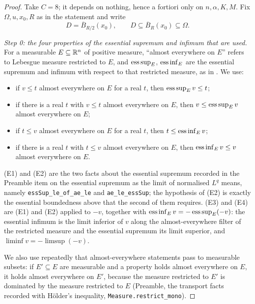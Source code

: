 \begin{proof}
Take $C=8$; it depends on nothing, hence a fortiori only on $n,\alpha,K,M$.
Fix $\Omega,u,x_0,R$ as in the statement and write
\[
D=\overline B_{R/2}(x_0),\qquad D\subseteq\overline B_R(x_0)\subseteq\Omega .
\]

\emph{Step 0: the four properties of the essential supremum and infimum that are
used.}  For a measurable $E\subseteq\mathbb{R}^n$ of positive measure, ``almost
everywhere on $E$'' refers to Lebesgue measure restricted to $E$, and
$\operatorname*{ess\,sup}_E$, $\operatorname*{ess\,inf}_E$ are the essential
supremum and infimum with respect to that restricted measure, as in
.  We use:
\begin{itemize}
\item[(E1)] if $v\le t$ almost everywhere on $E$ for a real $t$, then
  $\operatorname*{ess\,sup}_Ev\le t$;
\item[(E2)] if there is a real $t$ with $v\le t$ almost everywhere on $E$, then
  $v\le\operatorname*{ess\,sup}_Ev$ almost everywhere on $E$;
\item[(E3)] if $t\le v$ almost everywhere on $E$ for a real $t$, then
  $t\le\operatorname*{ess\,inf}_Ev$;
\item[(E4)] if there is a real $t$ with $t\le v$ almost everywhere on $E$, then
  $\operatorname*{ess\,inf}_Ev\le v$ almost everywhere on $E$.
\end{itemize}
(E1) and (E2) are the two facts about the essential supremum recorded in the
Preamble item on the essential supremum as the limit of normalised $L^q$ means,
namely \texttt{essSup\_le\_of\_ae\_le} and \texttt{ae\_le\_essSup}; the
hypothesis of (E2) is exactly the essential boundedness above that the second of
them requires.  (E3) and (E4) are (E1) and (E2) applied to $-v$, together with
$\operatorname*{ess\,inf}_Ev=-\operatorname*{ess\,sup}_E(-v)$: the essential
infimum is the limit inferior of $v$ along the almost-everywhere filter of the
restricted measure and the essential supremum its limit superior, and
$\liminf v=-\limsup(-v)$.

We also use repeatedly that almost-everywhere statements pass to measurable
subsets: if $E'\subseteq E$ are measurable and a property holds almost
everywhere on $E$, it holds almost everywhere on $E'$, because the measure
restricted to $E'$ is dominated by the measure restricted to $E$ (Preamble, the
transport facts recorded with H\"older's inequality,
\texttt{Measure.restrict\_mono}).


\end{proof}
